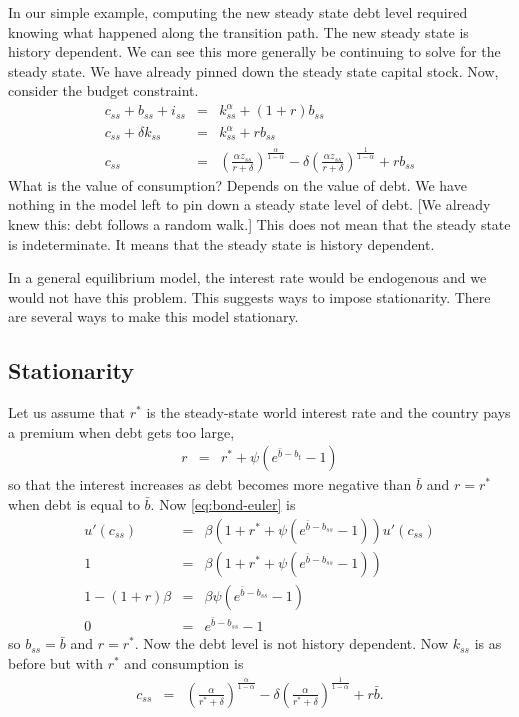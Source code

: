 \documentclass[11pt,pdftex,twoside,letterpaper]{exam}
\begin{document}
In our simple example, computing the new steady state debt level required knowing what happened along the transition path. The new steady state is history dependent. We can see this more generally be continuing to solve for the steady state. We have already pinned down the steady state capital stock. Now, consider the budget constraint.
\begin{eqnarray}
    c_{ss} +b_{ss} +i_{ss} &=& k_{ss}^\alpha+(1+r)b_{ss}\\
    c_{ss} + \delta k_{ss} &=& k_{ss}^\alpha + rb_{ss}\\
    c_{ss} &=& \left(\frac{\alpha z_{ss}}{r+\delta}\right)^\frac{\alpha }{1-\alpha} - \delta \left(\frac{\alpha z_{ss}}{r+\delta}\right)^\frac{1}{1-\alpha}  + rb_{ss}
\end{eqnarray}
What is the value of consumption? Depends on the value of debt. We have nothing in the model left to pin down a steady state level of debt. [We already knew this: debt follows a random walk.] This does not mean that the steady state is indeterminate. It means that the steady state is history dependent.

In a general equilibrium model, the interest rate would be endogenous and we would not have this problem. This suggests ways to impose stationarity. There are several ways to make this model stationary.
\subsection{Stationarity}
Let us assume that $r^*$ is the steady-state world interest rate and the country pays a premium when debt gets too large,
\begin{eqnarray}
  r &=& r^* + \psi\left(e^{\bar{b}-b_t}-1\right)
\end{eqnarray}
so that the interest increases as debt becomes more negative than $\bar{b}$ and $r=r^*$ when debt is equal to $\bar{b}$. Now \eqref{eq:bond-euler} is
\begin{eqnarray}
  u'(c_{ss}) &=& \beta(1+r^*+\psi\left(e^{\bar{b}-b_{ss}}-1\right))u'(c_{ss})\\
  1 &=& \beta(1+r^*+\psi\left(e^{\bar{b}-b_{ss}}-1\right))\\
  1 - (1+r)\beta &=& \beta\psi\left(e^{\bar{b}-b_{ss}}-1\right)\\
  0 &=& e^{\bar{b}-b_{ss}}-1
\end{eqnarray}
so $b_{ss}=\bar{b}$ and $r=r^*$. Now the debt level is not history dependent. Now $k_{ss}$ is as before but with $r^*$ and consumption is
\begin{eqnarray}
c_{ss} &=& \left(\frac{\alpha}{r^*+\delta}\right)^\frac{\alpha}{1-\alpha} - \delta \left(\frac{\alpha}{r^*+\delta}\right)^\frac{1}{1-\alpha}  + r\bar{b}.
\end{eqnarray}
\end{document}
